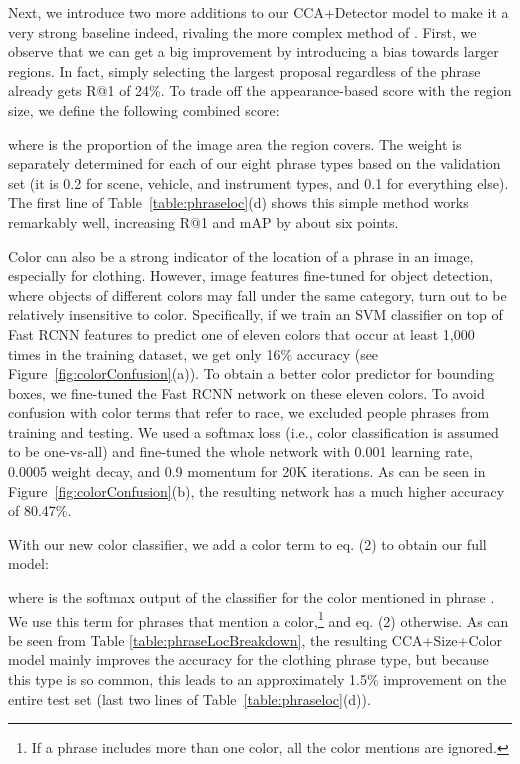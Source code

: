 \documentclass[twocolumn]{svjour3}
\begin{document}
Next, we introduce two more additions to our CCA+Detector model to make it a very strong baseline indeed, rivaling the more complex method of \cite{rohrbach2015}. First, we observe that we can get a big improvement by introducing a bias towards larger regions. In fact, simply selecting the largest proposal regardless of the phrase already gets R@1 of 24\%. To trade off the appearance-based score with the region size, we define the following combined score:


\noindent where  is the proportion of the image area the region  covers.  The weight  is separately determined for each of our eight phrase types based on the validation set (it is 0.2 for scene, vehicle, and instrument types, and 0.1 for everything else). The first line of Table~\ref{table:phraseloc}(d) shows this simple method works remarkably well, increasing R@1 and mAP by about six points.



Color can also be a strong indicator of the location of a phrase in an image, especially for clothing. However, image features fine-tuned for object detection, where objects of different colors may fall under the same category, turn out to be relatively insensitive to color. Specifically, if we train an SVM classifier on top of Fast RCNN features to predict one of eleven colors that occur at least 1,000 times in the training dataset, we get only 16\% accuracy (see Figure~\ref{fig:colorConfusion}(a)). 
To obtain a better color predictor for bounding boxes, we fine-tuned the Fast RCNN network on these eleven colors. To avoid confusion with color terms that refer to race, we excluded people phrases from training and testing. We used a softmax loss (i.e., color classification is assumed to be one-vs-all) and fine-tuned the whole network with 0.001 learning rate, 0.0005 weight decay, and 0.9 momentum for 20K iterations.  As can be seen in Figure~\ref{fig:colorConfusion}(b), the resulting network has a much higher accuracy of 80.47\%.  


With our new color classifier, we add a color term to eq. (2) to obtain our full model:

where  is the softmax output of the classifier for the color mentioned in phrase . We use this term for phrases that mention a color,\footnote{If a phrase includes more than one color, all the color mentions are ignored.} and eq. (2) otherwise. As can be seen from Table \ref{table:phraseLocBreakdown}, the resulting CCA+Size+Color model mainly improves the accuracy for the clothing phrase type, but because this type is so common, this leads to an approximately 1.5\% improvement on the entire test set (last two lines of Table~\ref{table:phraseloc}(d)).  
\end{document}
